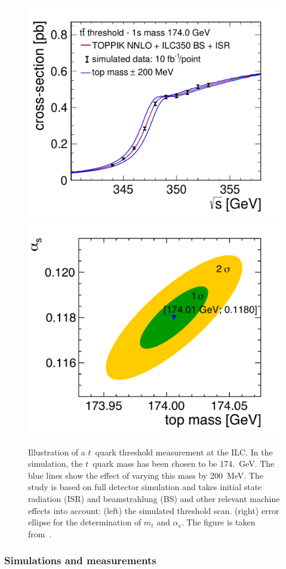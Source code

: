 \begin{figure}
\centering
\includegraphics[width=0.50\columnwidth]{ILC_TopThreshold.pdf}
\includegraphics[width=0.40\columnwidth]{contours-10-ilc.pdf}
\caption{Illustration of a $t$~quark threshold measurement at the ILC. 
In the simulation, the $t$~quark mass has been 
chosen to be 174.~GeV.  The blue lines show the effect of varying this 
mass by 200~MeV. The study is based on full detector simulation and takes 
initial state radiation (ISR) and beamstrahlung (BS) and other relevant 
machine effects into account: (left) the simulated threshold scan.  (right) 
error ellipse for the determination of $m_t$ and $\alpha_s$. The figure is
 taken from~\cite{Seidel:2013sqa}.}
\label{fig:ttthresh-scan}
\end{figure}
 
\subsubsection{Simulations and measurements}

